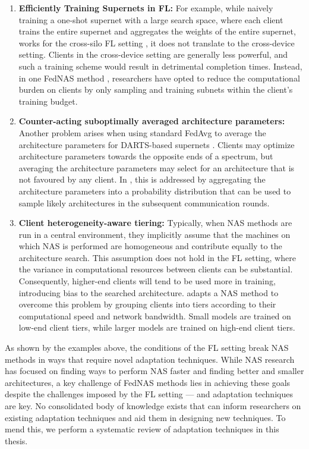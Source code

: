 \begin{enumerate}
    \item \textbf{Efficiently Training Supernets in FL:} For example, while naively training a one-shot supernet with a large search space, where each client trains the entire supernet and aggregates the weights of the entire supernet, works for the cross-silo FL setting \cite{fednas_2021}, it does not translate to the cross-device setting. Clients in the cross-device setting are generally less powerful, and such a training scheme would result in detrimental completion times. Instead, in one FedNAS method \cite{fedoras_2022}, researchers have opted to reduce the computational burden on clients by only sampling and training subnets within the client's training budget.
    \item \textbf{Counter-acting suboptimally averaged architecture parameters:} Another problem arises when using standard FedAvg to average the architecture parameters for DARTS-based supernets \cite{darts_2019}. Clients may optimize architecture parameters towards the opposite ends of a spectrum, but averaging the architecture parameters may select for an architecture that is not favoured by any client. In \cite{efnas_2024}, this is addressed by aggregating the architecture parameters into a probability distribution that can be used to sample likely architectures in the subsequent communication rounds.
    \item \textbf{Client heterogeneity-aware tiering:} Typically, when NAS methods are run in a central environment, they implicitly assume that the machines on which NAS is performed are homogeneous and contribute equally to the architecture search. This assumption does not hold in the FL setting, where the variance in computational resources between clients can be substantial. Consequently, higher-end clients will tend to be used more in training, introducing bias to the searched architecture. \cite{network_aware_fed_nas_2025} adapts a NAS method to overcome this problem by grouping clients into tiers according to their computational speed and network bandwidth. Small models are trained on low-end client tiers, while larger models are trained on high-end client tiers.
\end{enumerate}

As shown by the examples above, the conditions of the FL setting break NAS methods in ways that require novel adaptation techniques. While NAS research has focused on finding ways to perform NAS faster and finding better and smaller architectures, a key challenge of FedNAS methods lies in achieving these goals despite the challenges imposed by the FL setting — and adaptation techniques are key. No consolidated body of knowledge exists that can inform researchers on existing adaptation techniques and aid them in designing new techniques. To mend this, we perform a systematic review of adaptation techniques in this thesis. 


